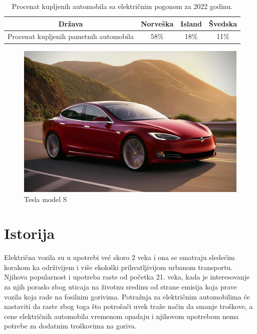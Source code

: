 \documentclass[a4paper]{article}
\begin{document}
\begin{table}[h!]
\begin{center}
\caption{Procenat kupljenih automobila sa električnim pogonom za 2022 godinu.}
\begin{tabular}{|c|c|c|c|} \hline
Država& Norveška& Island& Švedska\\ \hline
Procenat kupljenih pametnih automobila& 58\%& 18\%& 11\%\\ \hline
\end{tabular}
\label{tab:tabela1}
\end{center}
\end{table}



\begin{figure}[h]
        \centering
        \includegraphics[width=\linewidth]{tesla.jpeg}
        \caption{Tesla model S}
        \label{fig:IMG_Tesla}
        \end{figure}
    
         
\label{sec:uvod}












\section{Istorija}
\label{sec:naslov1}


Električna vozila su u upotrebi već skoro 2 veka i ona se smatraju sledećim korakom ka održivijem i više ekološki prihvatljivijom urbanom transportu. Njihova popularnost i upotreba raste od početka 21. veka, kada je interesovanje za njih poraslo zbog uticaja na životnu sredinu od strane emisija koja prave vozila koja rade na fosilnim gorivima. Potražnja za električnim automobilima će nastaviti da raste zbog toga što potrošači uvek traže način da smanje troškove, a cene električnih automobila vremenom opadaju i njihovom upotrebom nema potrebe za dodatnim troškovima na goriva.
\cite{istorija1}
\end{document}
